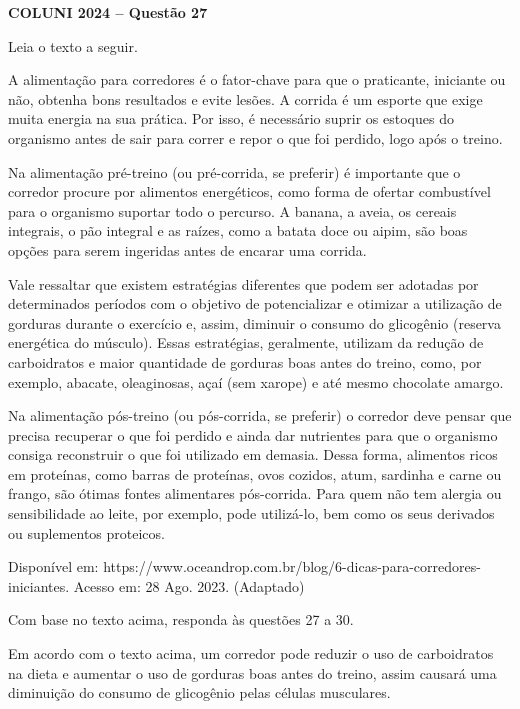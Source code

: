 \textbf{COLUNI 2024 -- Questão 27}\par\medskip Leia o texto a seguir.

A alimentação para corredores é o fator-chave para que o praticante, iniciante ou não, obtenha bons resultados e evite lesões. A corrida é um esporte que exige muita energia na sua prática. Por isso, é necessário suprir os estoques do organismo antes de sair para correr e repor o que foi perdido, logo após o treino.

Na alimentação pré-treino (ou pré-corrida, se preferir) é importante que o corredor procure por alimentos energéticos, como forma de ofertar combustível para o organismo suportar todo o percurso. A banana, a aveia, os cereais integrais, o pão integral e as raízes, como a batata doce ou aipim, são boas opções para serem ingeridas antes de encarar uma corrida.

Vale ressaltar que existem estratégias diferentes que podem ser adotadas por determinados períodos com o objetivo de potencializar e otimizar a utilização de gorduras durante o exercício e, assim, diminuir o consumo do glicogênio (reserva energética do músculo). Essas estratégias, geralmente, utilizam da redução de carboidratos e maior quantidade de gorduras boas antes do treino, como, por exemplo, abacate, oleaginosas, açaí (sem xarope) e até mesmo chocolate amargo.

Na alimentação pós-treino (ou pós-corrida, se preferir) o corredor deve pensar que precisa recuperar o que foi perdido e ainda dar nutrientes para que o organismo consiga reconstruir o que foi utilizado em demasia. Dessa forma, alimentos ricos em proteínas, como barras de proteínas, ovos cozidos, atum, sardinha e carne ou frango, são ótimas fontes alimentares pós-corrida. Para quem não tem alergia ou sensibilidade ao leite, por exemplo, pode utilizá-lo, bem como os seus derivados ou suplementos proteicos.

Disponível em: https://www.oceandrop.com.br/blog/6-dicas-para-corredores-iniciantes. Acesso em: 28 Ago. 2023. (Adaptado)

Com base no texto acima, responda às questões 27 a 30.

Em acordo com o texto acima, um corredor pode reduzir o uso de carboidratos na dieta e aumentar o uso de gorduras boas antes do treino, assim causará uma diminuição do consumo de glicogênio pelas células musculares.

\par

